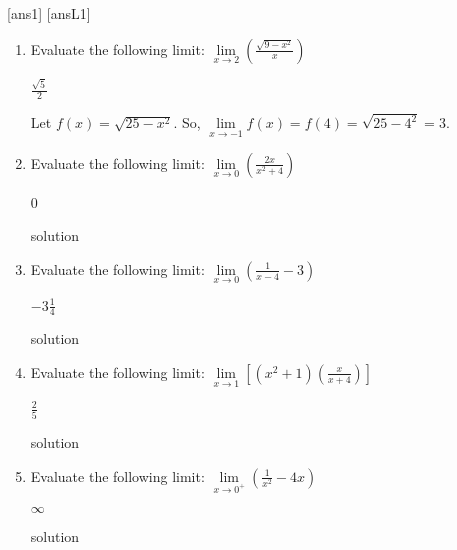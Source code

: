 [ans1]
[ansL1]
\begin{enumerate}[leftmargin=*]
    \item Evaluate the following limit: \(\lim\limits_{x \to 2} \displaystyle\left(\frac{\sqrt{9-x^2}}{x}\right)\)
    \begin{sol}
  
   $\frac{\sqrt{5}}{2}$
    \end{sol}
    \begin{solL}
    Let \(f(x)=\sqrt{25-x^2}\). So, $\lim\limits_{x \to -1} f(x)=f(4)=\sqrt{25-4^2}=3$.
    
    \end{solL}
\vspace{0.325in}
\item Evaluate the following limit: \(\lim\limits_{x \to 0} \displaystyle \left(\frac{2x}{x^2+4}\right)\)
    \begin{sol}
    0
    \end{sol}
    \begin{solL}
    solution
    \end{solL}

\vspace{0.325in}

\item Evaluate the following limit: \(\lim\limits_{x \to 0} \displaystyle \left(\frac{1}{x-4}-3\right)\)
    \begin{sol}
    $-3\frac{1}{4}$
    \end{sol}
    \begin{solL}
    solution
    \end{solL}

\vspace{0.325in}

\item Evaluate the following limit: \(\lim\limits_{x \to 1} \displaystyle \left[\left(x^2+1\right)\left(\frac{x}{x+4}\right)\right]\)
    \begin{sol}
    $\frac{2}{5}$
    \end{sol}
    \begin{solL}
    solution
    \end{solL}

\vspace{0.325in}

\item Evaluate the following limit: \(\lim\limits_{x \to 0^+} \displaystyle \left(\frac{1}{x^2}-4x\right)\)
    \begin{sol}
    $\infty$
    \end{sol}
    \begin{solL}
    solution
    \end{solL}


\end{enumerate}
